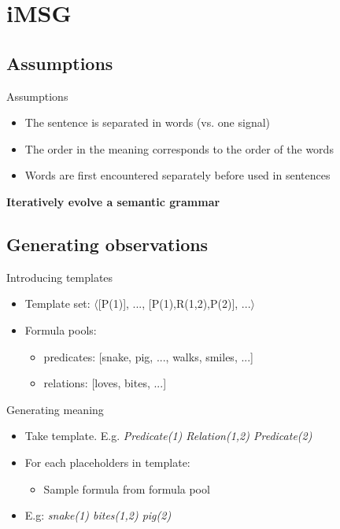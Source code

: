 \documentclass[11pt,a4paper,xcolor=dvipsnames]{beamer}
\begin{document}
\section{iMSG}
\subsection{Assumptions}
\begin{frame}{Assumptions}
\begin{itemize}
  \item The sentence is separated in words (vs. one signal)
  \item The order in the meaning corresponds to the order of the words
  \item Words are first encountered separately before used in sentences
\end{itemize}
\end{frame}

\begin{frame}
  \begin{center}
  {\Huge \textbf{Iteratively evolve a semantic grammar}}
  \end{center}
\end{frame}

\subsection{Generating observations}%

\begin{frame}{Introducing templates}
\begin{itemize}
  \item Template set: $\langle$[P(1)], ..., [P(1),R(1,2),P(2)], ...$\rangle$
  \item Formula pools:
  \begin{itemize}
    \item predicates: [snake, pig, ..., walks, smiles, ...] %
    \item relations: [loves, bites, ...] %
  \end{itemize}
\end{itemize}
\end{frame}

\begin{frame}{Generating meaning}
\begin{itemize}
  \item Take template. E.g. \textit{ Predicate(1) Relation(1,2) Predicate(2) }
  \item For each placeholders in template:
  \begin{itemize}
    \item Sample formula from formula pool
  \end{itemize}
  \item E.g: \textit{ snake(1) bites(1,2) pig(2) }
\end{itemize}
\end{frame}
\end{document}
